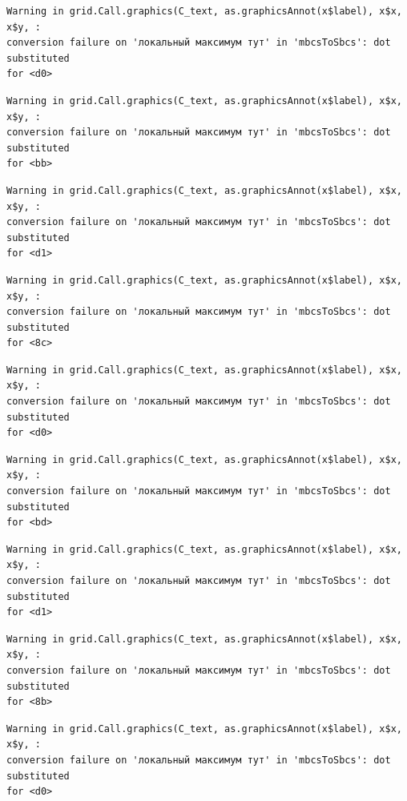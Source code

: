 \documentclass[
  letterpaper,
  DIV=11,
  numbers=noendperiod]{scrreprt}
\theoremstyle{definition}
\theoremstyle{remark}
\begin{document}
\begin{verbatim}
Warning in grid.Call.graphics(C_text, as.graphicsAnnot(x$label), x$x, x$y, :
conversion failure on 'локальный максимум тут' in 'mbcsToSbcs': dot substituted
for <d0>
\end{verbatim}

\begin{verbatim}
Warning in grid.Call.graphics(C_text, as.graphicsAnnot(x$label), x$x, x$y, :
conversion failure on 'локальный максимум тут' in 'mbcsToSbcs': dot substituted
for <bb>
\end{verbatim}

\begin{verbatim}
Warning in grid.Call.graphics(C_text, as.graphicsAnnot(x$label), x$x, x$y, :
conversion failure on 'локальный максимум тут' in 'mbcsToSbcs': dot substituted
for <d1>
\end{verbatim}

\begin{verbatim}
Warning in grid.Call.graphics(C_text, as.graphicsAnnot(x$label), x$x, x$y, :
conversion failure on 'локальный максимум тут' in 'mbcsToSbcs': dot substituted
for <8c>
\end{verbatim}

\begin{verbatim}
Warning in grid.Call.graphics(C_text, as.graphicsAnnot(x$label), x$x, x$y, :
conversion failure on 'локальный максимум тут' in 'mbcsToSbcs': dot substituted
for <d0>
\end{verbatim}

\begin{verbatim}
Warning in grid.Call.graphics(C_text, as.graphicsAnnot(x$label), x$x, x$y, :
conversion failure on 'локальный максимум тут' in 'mbcsToSbcs': dot substituted
for <bd>
\end{verbatim}

\begin{verbatim}
Warning in grid.Call.graphics(C_text, as.graphicsAnnot(x$label), x$x, x$y, :
conversion failure on 'локальный максимум тут' in 'mbcsToSbcs': dot substituted
for <d1>
\end{verbatim}

\begin{verbatim}
Warning in grid.Call.graphics(C_text, as.graphicsAnnot(x$label), x$x, x$y, :
conversion failure on 'локальный максимум тут' in 'mbcsToSbcs': dot substituted
for <8b>
\end{verbatim}

\begin{verbatim}
Warning in grid.Call.graphics(C_text, as.graphicsAnnot(x$label), x$x, x$y, :
conversion failure on 'локальный максимум тут' in 'mbcsToSbcs': dot substituted
for <d0>
\end{verbatim}
\end{document}
